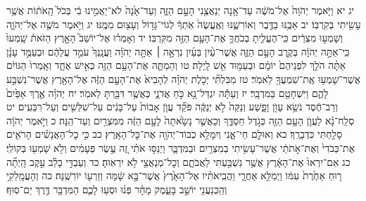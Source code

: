 \documentclass[twoside, openany, parskip=half, 11pt]{book}
\begin{document}
יג יא וַיֹּ֤אמֶר יְהֹוָה֙ אֶל־מֹשֶׁ֔ה עַד־אָ֥נָה יְנַאֲצֻ֖נִי הָעָ֣ם הַזֶּ֑ה וְעַד־אָ֙נָה֙ לֹא־יַאֲמִ֣ינוּ בִ֔י בְּכֹל֙ הָֽאֹת֔וֹת אֲשֶׁ֥ר עָשִׂ֖יתִי בְּקִרְבּֽוֹ׃ יב אַכֶּ֥נּוּ בַדֶּ֖בֶר וְאוֹרִשֶׁ֑נּוּ וְאֶֽעֱשֶׂה֙ אֹֽתְךָ֔ לְגוֹי־גָּד֥וֹל וְעָצ֖וּם מִמֶּֽנּוּ׃ יג וַיֹּ֥אמֶר מֹשֶׁ֖ה אֶל־יְהֹוָ֑ה וְשָׁמְע֣וּ מִצְרַ֔יִם כִּֽי־הֶעֱלִ֧יתָ בְכֹחֲךָ֛ אֶת־הָעָ֥ם הַזֶּ֖ה מִקִּרְבּֽוֹ׃ יד וְאָמְר֗וּ אֶל־יוֹשֵׁב֮ הָאָ֣רֶץ הַזֹּאת֒ שָֽׁמְעוּ֙ כִּֽי־אַתָּ֣ה יְהֹוָ֔ה בְּקֶ֖רֶב הָעָ֣ם הַזֶּ֑ה אֲשֶׁר־עַ֨יִן בְּעַ֜יִן נִרְאָ֣ה ׀ אַתָּ֣ה יְהֹוָ֗ה וַעֲנָֽנְךָ֙ עֹמֵ֣ד עֲלֵהֶ֔ם וּבְעַמֻּ֣ד עָנָ֗ן אַתָּ֨ה הֹלֵ֤ךְ לִפְנֵיהֶם֙ יוֹמָ֔ם וּבְעַמּ֥וּד אֵ֖שׁ לָֽיְלָה׃ טו וְהֵמַתָּ֛ה אֶת־הָעָ֥ם הַזֶּ֖ה כְּאִ֣ישׁ אֶחָ֑ד וְאָֽמְרוּ֙ הַגּוֹיִ֔ם אֲשֶׁר־שָׁמְע֥וּ אֶֽת־שִׁמְעֲךָ֖ לֵאמֹֽר׃ טז מִבִּלְתִּ֞י יְכֹ֣לֶת יְהֹוָ֗ה לְהָבִיא֙ אֶת־הָעָ֣ם הַזֶּ֔ה אֶל־הָאָ֖רֶץ אֲשֶׁר־נִשְׁבַּ֣ע לָהֶ֑ם וַיִּשְׁחָטֵ֖ם בַּמִּדְבָּֽר׃ יז וְעַתָּ֕ה יִגְדַּל־נָ֖א כֹּ֣חַ אֲדֹנָ֑י כַּאֲשֶׁ֥ר דִּבַּ֖רְתָּ לֵאמֹֽר׃ יח יְהֹוָ֗ה אֶ֤רֶךְ אַפַּ֙יִם֙ וְרַב־חֶ֔סֶד נֹשֵׂ֥א עָוֺ֖ן וָפָ֑שַׁע וְנַקֵּה֙ לֹ֣א יְנַקֶּ֔ה פֹּקֵ֞ד עֲוֺ֤ן אָבוֹת֙ עַל־בָּנִ֔ים עַל־שִׁלֵּשִׁ֖ים וְעַל־רִבֵּעִֽים׃ יט סְלַֽח־נָ֗א לַעֲוֺ֛ן הָעָ֥ם הַזֶּ֖ה כְּגֹ֣דֶל חַסְדֶּ֑ךָ וְכַאֲשֶׁ֤ר נָשָׂ֙אתָה֙ לָעָ֣ם הַזֶּ֔ה מִמִּצְרַ֖יִם וְעַד־הֵֽנָּה׃ כ וַיֹּ֣אמֶר יְהֹוָ֔ה סָלַ֖חְתִּי כִּדְבָרֶֽךָ׃ כא וְאוּלָ֖ם חַי־אָ֑נִי וְיִמָּלֵ֥א כְבוֹד־יְהֹוָ֖ה אֶת־כׇּל־הָאָֽרֶץ׃ כב כִּ֣י כׇל־הָאֲנָשִׁ֗ים הָרֹאִ֤ים אֶת־כְּבֹדִי֙ וְאֶת־אֹ֣תֹתַ֔י אֲשֶׁר־עָשִׂ֥יתִי בְמִצְרַ֖יִם וּבַמִּדְבָּ֑ר וַיְנַסּ֣וּ אֹתִ֗י זֶ֚ה עֶ֣שֶׂר פְּעָמִ֔ים וְלֹ֥א שָׁמְע֖וּ בְּקוֹלִֽי׃ כג אִם־יִרְאוּ֙ אֶת־הָאָ֔רֶץ אֲשֶׁ֥ר נִשְׁבַּ֖עְתִּי לַאֲבֹתָ֑ם וְכׇל־מְנַאֲצַ֖י לֹ֥א יִרְאֽוּהָ׃ כד וְעַבְדִּ֣י כָלֵ֗ב עֵ֣קֶב הָֽיְתָ֞ה ר֤וּחַ אַחֶ֙רֶת֙ עִמּ֔וֹ וַיְמַלֵּ֖א אַחֲרָ֑י וַהֲבִֽיאֹתִ֗יו אֶל־הָאָ֙רֶץ֙ אֲשֶׁר־בָּ֣א שָׁ֔מָּה וְזַרְע֖וֹ יוֹרִשֶֽׁנָּה׃ כה וְהָעֲמָֽלֵקִ֥י וְהַֽכְּנַעֲנִ֖י יוֹשֵׁ֣ב בָּעֵ֑מֶק מָחָ֗ר פְּנ֨וּ וּסְע֥וּ לָכֶ֛ם הַמִּדְבָּ֖ר דֶּ֥רֶךְ יַם־סֽוּף׃
\end{document}
